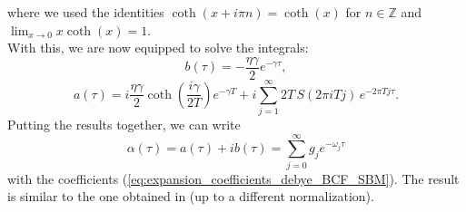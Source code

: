 where we used the identities $\coth(x+i\pi n) = \coth(x)$ for $n\in\mathbb{Z}$ and $\lim_{x\rightarrow
0}x\coth(x)=1$.
\\
With this, we are now equipped to solve the integrals:
\begin{equation*}
    b(\tau) = -\frac{\eta\gamma}{2} e^{-\gamma\tau},
\end{equation*}
\begin{equation*}
    a(\tau) = i\frac{\eta\gamma}{2}\coth\left(
        \frac{i\gamma}{2T}
    \right)e^{-\gamma T} + i\sum_{j=1}^{\infty}2T\,S(2\pi iTj)\,e^{-2\pi Tj\tau}.
\end{equation*}
Putting the results together, we can write
\begin{equation*}
    \alpha(\tau) = a(\tau) + ib(\tau) = \sum_{j=0}^{\infty} g_j e^{-\omega_j\tau}
\end{equation*}
with the coefficients (\ref{eq:expansion_coefficients_debye_BCF_SBM}).
The result is similar to the one obtained in \cite{Qiang:2009} (up to a different normalization).